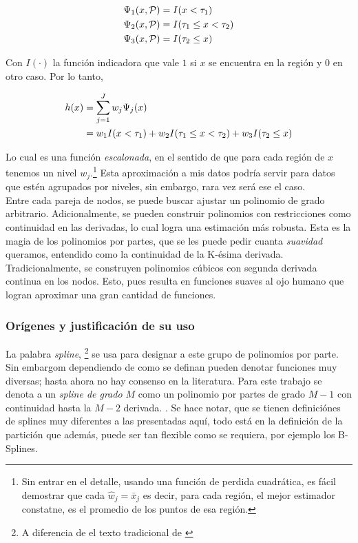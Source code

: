 \documentclass[../Main/Main.tex]{subfiles}
\begin{document}
\begin{align*}
	\Psi_1(x,\mathcal{P}) &= I( x <  \tau_1) \\
	\Psi_2(x,\mathcal{P}) &= I( \tau_1 \leq x <  \tau_2) \\
	\Psi_3(x,\mathcal{P}) &= I( \tau_2 \leq x ) 
\end{align*}

Con $I(\cdot)$ la función indicadora que vale $1$ si $x$ se encuentra en la región y $0$ en otro caso. Por lo tanto, 

\begin{align*}
		h(x) &= \sum_{j = 1}^J w_j\Psi_j(x) \\
			 &= w_1 I( x <  \tau_1) + w_2 I( \tau_1 \leq x <  \tau_2) + w_3 I( \tau_2 \leq x)
\end{align*}

Lo cual es una función \textit{escalonada}, en el sentido de que para cada región de $x$ tenemos un nivel $w_j$.\footnote{Sin entrar en el detalle, usando una función de perdida cuadrática, es fácil demostrar que cada $\hat{w}_j = \bar{x}_j$ es decir, para cada región, el mejor estimador constatne, es el promedio de los puntos de esa región.} Esta aproximación a mis datos podría servir para datos que estén agrupados por niveles, sin embargo, rara vez será ese el caso.\\

Entre cada pareja de nodos, se puede buscar ajustar un polinomio de grado arbitrario. Adicionalmente, se pueden construir polinomios con  restricciones como continuidad en las derivadas, lo cual logra una estimación más robusta. Esta es la magia de los polinomios por partes, que se les puede pedir cuanta \textit{suavidad} queramos, entendido como la continuidad de la K-ésima derivada. Tradicionalmente, se construyen polinomios cúbicos con segunda derivada continua en los nodos. Esto, pues resulta en funciones suaves al ojo humano que logran aproximar una gran cantidad de funciones.

\subsubsection{Orígenes y justificación de su uso}
La palabra \textit{spline}, \footnote{A diferencia de el texto tradicional de \autocite{deboor1978splines}} se usa para designar a este grupo de polinomios por parte. Sin embargom dependiendo de como se definan pueden denotar funciones muy diversas; hasta ahora no hay consenso en la literatura. Para este trabajo se denota a un \textit{spline de grado $M$} como un polinomio por partes de grado $M-1$ con continuidad hasta la $M-2$ derivada. \autocite{wasserman2007all}. Se hace notar, que se tienen definiciónes de splines muy diferentes a las presentadas aquí, todo está en la definición de la partición que además, puede ser tan flexible como se requiera, por ejemplo los B-Splines.\\
\end{document}
